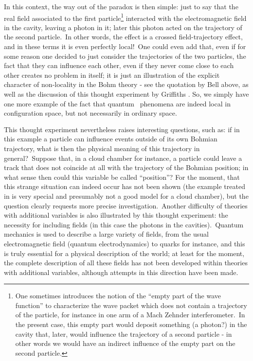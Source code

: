 \documentclass[12pt,onecolumn]{article}%
\begin{document}
In this context, the way out of the paradox is then simple: just to say that
the real field associated to the first particle\footnote{One sometimes
introduces the notion of the ``empty part of the wave function'' to
characterize the wave packet which does not contain a trajectory of the
particle, for instance in one arm of a Mach Zehnder interferometer.\ In the
present case, this empty part would deposit something (a photon?) in the
cavity that, later, would influence the trajectory of a second particle - in
other words we would have an indirect influence of the empty part on the
second particle.} interacted with the electromagnetic field in the cavity,
leaving a photon in it; later this photon acted on the trajectory of the
second particle.\ In other words, the effect is a crossed field-trajectory
effect, and in these terms it is even perfectly local!\ One could even add
that, even if for some reason one decided to just consider the trajectories of
the two particles, the fact that they can influence each other, even if they
never come close to each other creates no problem in itself; it is just an
illustration of the explicit character of non-locality in the Bohm theory -
see the quotation by Bell above, as well as the discussion of this thought
experiment by Griffiths \cite{Griffiths-Bohm}. So, we simply have one more
example of the fact that quantum \ phenomena are indeed local in configuration
space, but not necessarily in ordinary space.

This thought experiment nevertheless raises interesting questions, such as: if
in this example a particle can influence events outside of its own Bohmian
trajectory, what is then the physical meaning of this trajectory in
general?\ Suppose that, in a cloud chamber for instance, a particle could
leave a track that does not coincide at all with the trajectory of the Bohmian
position; in what sense then could this variable be called ``position''? For
the moment, that this strange situation can indeed occur has not been shown
(the example treated in \cite{Englert} is very special and presumably not a
good model for a cloud chamber), but the question clearly requests more
precise investigation.\ Another difficulty of theories with additional
variables is also illustrated by this thought experiment: the necessity for
including fields (in this case the photons in the cavities).\ Quantum
mechanics is used to describe a large variety of fields, from the usual
electromagnetic field (quantum electrodynamics) to quarks for instance, and
this is truly essential for a physical description of the world; at least for
the moment, the complete description of all these fields has not been
developed within theories with additional variables, although attempts in this
direction have been made.
\end{document}

